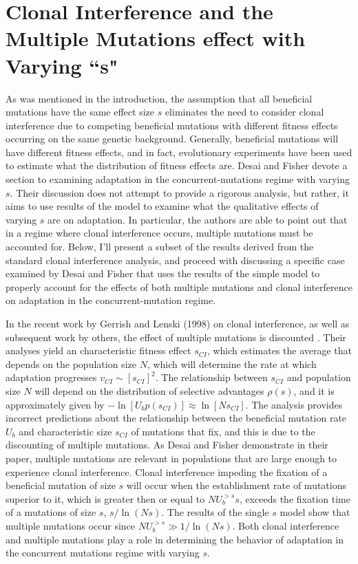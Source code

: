 \documentclass[12pt, one column]{article}
\begin{document}
\section*{Clonal Interference and the Multiple Mutations effect with Varying ``s"}
As was mentioned in the introduction, the assumption that all beneficial mutations have the same effect size $s$ eliminates the need to consider clonal interference due to competing beneficial mutations with different fitness effects occurring on the same genetic background.  Generally, beneficial mutations will have different fitness effects, and in fact, evolutionary experiments have been used to estimate what the distribution of fitness effects are.  Desai and Fisher devote a section to examining adaptation in the concurrent-mutations regime with varying $s$.  Their discussion does not attempt to provide a rigorous analysis, but rather, it aims to use results of the model to examine what the qualitative effects of varying $s$ are on adaptation.  In particular, the authors are able to point out that in a regime where clonal interference occurs, multiple mutations must be accounted for.  Below, I'll present a subset of the results derived from the standard clonal interference analysis, and proceed with discussing a specific case examined by Desai and Fisher that uses the results of the simple model to properly account for the effects of both multiple mutations and clonal interference on adaptation in the concurrent-mutation regime.

In the recent work by Gerrish and Lenski (1998) on clonal interference, as well as subsequent work by others, the effect of multiple mutations is discounted .  Their analyses yield an characteristic fitness effect $s_{CI}$, which estimates the average  that depends on the population size $N$, which will determine the rate at which adaptation progresses $v_{CI} \sim [s_{CI}]^2$.  The relationship between $s_{CI}$ and population size $N$ will depend on the distribution of selective advantages $\rho(s)$, and it is approximately given by $-\ln[U_b p(s_{CI})] \approx \ln[N s_{CI}]$.  The analysis provides incorrect predictions about the relationship between the beneficial mutation rate $U_b$ and characteristic size $s_{CI}$ of mutations that fix, and this is due to the discounting of multiple mutations.  As Desai and Fisher demonstrate in their paper, multiple mutations are relevant in populations that are large enough to experience clonal interference.  Clonal interference impeding the fixation of a beneficial mutation of size $s$ will occur when the establishment rate of mutations superior to it, which is greater then or equal to $NU_b^{>s}s$, exceeds the fixation time of a mutations of size $s$, $s/\ln(Ns)$.  The results of the single $s$ model show that multiple mutations occur since $NU_b^{>s} \gg 1/\ln(Ns)$.  Both clonal interference and multiple mutations play a role in determining the behavior of adaptation in the concurrent mutations regime with varying $s$.
\end{document}
